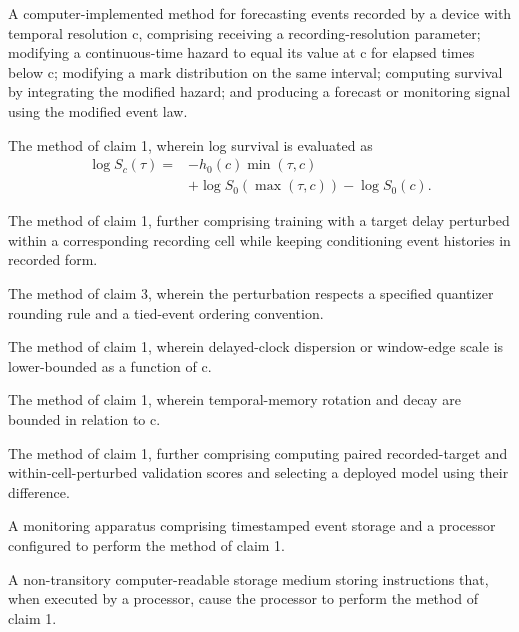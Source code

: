 \documentclass[pct]{sm-patent}
\begin{document}
\begin{patentclaims}

\item A computer-implemented method for forecasting events recorded by a device with temporal resolution c, comprising receiving a recording-resolution parameter; modifying a continuous-time hazard to equal its value at c for elapsed times below c; modifying a mark distribution on the same interval; computing survival by integrating the modified hazard; and producing a forecast or monitoring signal using the modified event law.

\item The method of claim 1, wherein log survival is evaluated as \[\begin{aligned}\log S_c(\tau)={}&-h_0(c)\min(\tau,c)\\ &+\log S_0(\max(\tau,c))-\log S_0(c).\end{aligned}\]

\item The method of claim 1, further comprising training with a target delay perturbed within a corresponding recording cell while keeping conditioning event histories in recorded form.

\item The method of claim 3, wherein the perturbation respects a specified quantizer rounding rule and a tied-event ordering convention.

\item The method of claim 1, wherein delayed-clock dispersion or window-edge scale is lower-bounded as a function of c.

\item The method of claim 1, wherein temporal-memory rotation and decay are bounded in relation to c.

\item The method of claim 1, further comprising computing paired recorded-target and within-cell-perturbed validation scores and selecting a deployed model using their difference.

\item A monitoring apparatus comprising timestamped event storage and a processor configured to perform the method of claim 1.

\item A non-transitory computer-readable storage medium storing instructions that, when executed by a processor, cause the processor to perform the method of claim 1.

\end{patentclaims}
\end{document}
